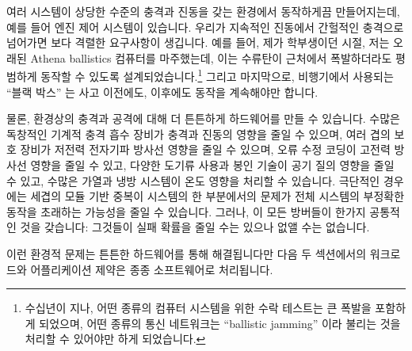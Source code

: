 여러 시스템이 상당한 수준의 충격과 진동을 갖는 환경에서 동작하게끔
만들어지는데, 예를 들어 엔진 제어 시스템이 있습니다.
우리가 지속적인 진동에서 간헐적인 충격으로 넘어가면 보다 격렬한 요구사항이
생깁니다.
예를 들어, 제가 학부생이던 시절, 저는 오래된 Athena ballistics 컴퓨터를
마주했는데, 이는 수류탄이 근처에서 폭발하더라도 평범하게 동작할 수 있도록
설계되었습니다.\footnote{
	수십년이 지나, 어떤 종류의 컴퓨터 시스템을 위한 수락 테스트는 큰 폭발을
	포함하게 되었으며, 어떤 종류의 통신 네트워크는 ``ballistic jamming''
	이라 불리는 것을 처리할 수 있어야만 하게 되었습니다.}
그리고 마지막으로, 비행기에서 사용되는 ``블랙 박스'' 는 사고 이전에도, 이후에도
동작을 계속해야만 합니다.

물론, 환경상의 충격과 공격에 대해 더 튼튼하게 하드웨어를 만들 수 있습니다.
수많은 독창적인 기계적 충격 흡수 장비가 충격과 진동의 영향을 줄일 수 있으며,
여러 겹의 보호 장비가 저전력 전자기파 방사선 영향을 줄일 수 있으며, 오류 수정
코딩이 고전력 방사선 영향을 줄일 수 있고, 다양한 도기류 사용과 봉인 기술이 공기
질의 영향을 줄일 수 있고, 수많은 가열과 냉방 시스템이 온도 영향을 처리할 수
있습니다.
극단적인 경우에는 세겹의 모듈 기반 중복이 시스템의 한 부분에서의 문제가 전체
시스템의 부정확한 동작을 초래하는 가능성을 줄일 수 있습니다.
그러나, 이 모든 방버들이 한가지 공통적인 것을 갖습니다: 그것들이 실패 확률을
줄일 수는 있으나 없앨 수는 없습니다.

이런 환경적 문제는 튼튼한 하드웨어를 통해 해결됩니다만 다음 두 섹션에서의
워크로드와 어플리케이션 제약은 종종 소프트웨어로 처리됩니다.

\iffalse

